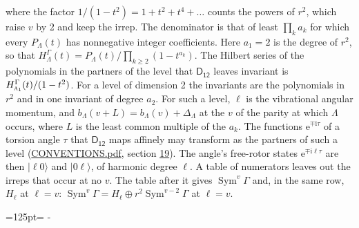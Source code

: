 \documentclass[10pt,a4paper]{article}
\newcommand{\needspace}[1]{\par\penalty-100\begingroup\dimen0=#1\relax\dimen2=\pagegoal
  \advance\dimen2-\pagetotal\ifdim\dimen0>\dimen2\relax\ifdim\dimen2>0pt\vfil\break\fi\fi
  \endgroup}
\numberwithin{equation}{section}
\newcommand{\grp}[1]{\mathsf{#1}}
\newcommand{\irr}[1]{\text{\normalfont\scshape #1}}
\newcommand{\iunit}{\mathrm{i}}
\newcommand{\expe}{\mathrm{e}}
\newcommand{\occ}[1]{\lvert #1\rangle}
\begin{document}
where the factor $1/(1 - t^2) = 1 + t^2 + t^4 + \dots$ counts the powers of $r^2$, which raise $v$ by 2 and keep the irrep. The denominator is that of least $\prod_k a_k$ for which every $P_\Lambda(t)$ has nonnegative integer coefficients. Here $a_1 = 2$ is the degree of $r^2$, so that $H^{\Gamma}_\Lambda(t) = P_\Lambda(t)/\prod_{k\ge2}(1 - t^{a_k})$. The Hilbert series of the polynomials in the partners of the level that $\grp{D_{12}}$ leaves invariant is $H^{\Gamma}_{\irr{a}_{1}}(t)/(1 - t^2)$. For a level of dimension 2 the invariants are the polynomials in $r^2$ and in one invariant of degree $a_2$. \label{n:index.overtone.period}\label{n:index.increment.unitary}For such a level, $\ell$ is the vibrational angular momentum, and $b_\Lambda(v + L) = b_\Lambda(v) + \Delta_\Lambda$ at the $v$ of the parity at which $\Lambda$ occurs, where $L$ is the least common multiple of the $a_k$. \label{n:local.torsion.angle}The functions $\expe^{\mp\iunit\tau}$ of a torsion angle $\tau$ that $\grp{D_{12}}$ maps affinely may transform as the partners of such a level (\href{../../CONVENTIONS.pdf}{CONVENTIONS.pdf}, section \href{../../CONVENTIONS.pdf\#conv.19}{19}). The angle's free-rotor states $\expe^{\mp\iunit\ell\tau}$ are then $\occ{\ell 0}$ and $\occ{0 \ell}$, of harmonic degree $\ell$. A table of numerators leaves out the irreps that occur at no $v$. The table after it gives $\operatorname{Sym}^{v}\Gamma$ and, in the same row, $H_\ell$ at $\ell = v$: $\operatorname{Sym}^{v}\Gamma = H_\ell \oplus r^2\operatorname{Sym}^{v-2}\Gamma$ at $\ell = v$.
\needspace{125pt}
\end{document}
